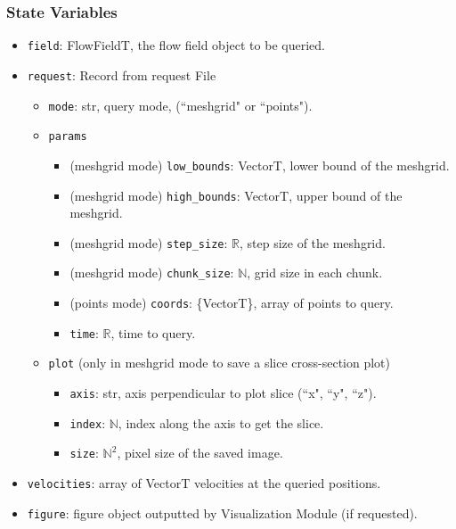\documentclass[12pt, titlepage]{article}
\begin{document}
\subsubsection{State Variables}
\begin{itemize}
  \item \texttt{field}: FlowFieldT, the flow field object to be queried.
  \item \texttt{request}: Record from request File
  \begin{itemize}
    \item \texttt{mode}: str, query mode, (``meshgrid" or ``points").
    \item \texttt{params}
    \begin{itemize}
      \item (meshgrid mode) \texttt{low\_bounds}: VectorT, lower bound of the meshgrid.
      \item (meshgrid mode) \texttt{high\_bounds}: VectorT, upper bound of the meshgrid.
      \item (meshgrid mode) \texttt{step\_size}: $\mathbb{R}$, step size of the meshgrid.
      \item (meshgrid mode) \texttt{chunk\_size}: $\mathbb{N}$, grid size in each chunk.
      \item (points mode) \texttt{coords}: \{VectorT\}, array of points to query.
      \item \texttt{time}: $\mathbb{R}$, time to query.
    \end{itemize}
    \item \texttt{plot} (only in meshgrid mode to save a slice cross-section plot)
    \begin{itemize}
      \item \texttt{axis}: str, axis perpendicular to plot slice (``x", ``y", ``z").
      \item \texttt{index}: $\mathbb{N}$, index along the axis to get the slice.
      \item \texttt{size}: $\mathbb{N}^2$, pixel size of the saved image.
    \end{itemize}
  \end{itemize}
  \item \texttt{velocities}: array of VectorT velocities at the queried positions.
  \item \texttt{figure}: figure object outputted by Visualization Module (if requested).
\end{itemize}
\end{document}
